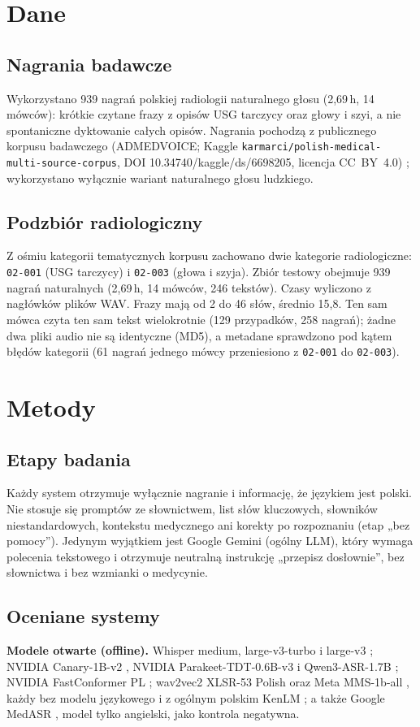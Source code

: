 \documentclass[conference]{IEEEtran}
\begin{document}
\section{Dane}
\subsection{Nagrania badawcze}
Wykorzystano 939 nagrań polskiej radiologii naturalnego głosu (2,69\,h, 14 mówców): krótkie czytane frazy z opisów USG tarczycy oraz głowy i szyi, a nie spontaniczne dyktowanie całych opisów. Nagrania pochodzą z publicznego korpusu badawczego (ADMEDVOICE; Kaggle \texttt{karmarci/polish-medical-multi-source-corpus}, DOI 10.34740/kaggle/ds/6698205, licencja CC~BY~4.0) \cite{r1}; wykorzystano wyłącznie wariant naturalnego głosu ludzkiego.

\subsection{Podzbiór radiologiczny}
Z ośmiu kategorii tematycznych korpusu zachowano dwie kategorie radiologiczne: \texttt{02-001} (USG tarczycy) i \texttt{02-003} (głowa i szyja). Zbiór testowy obejmuje 939 nagrań naturalnych (2,69\,h, 14 mówców, 246 tekstów). Czasy wyliczono z nagłówków plików WAV. Frazy mają od 2 do 46 słów, średnio 15,8. Ten sam mówca czyta ten sam tekst wielokrotnie (129 przypadków, 258 nagrań); żadne dwa pliki audio nie są identyczne (MD5), a metadane sprawdzono pod kątem błędów kategorii (61 nagrań jednego mówcy przeniesiono z \texttt{02-001} do \texttt{02-003}).

\section{Metody}
\subsection{Etapy badania}
Każdy system otrzymuje wyłącznie nagranie i informację, że językiem jest polski. Nie stosuje się promptów ze słownictwem, list słów kluczowych, słowników niestandardowych, kontekstu medycznego ani korekty po rozpoznaniu (etap „bez pomocy''). Jedynym wyjątkiem jest Google Gemini (ogólny LLM), który wymaga polecenia tekstowego i otrzymuje neutralną instrukcję „przepisz dosłownie'', bez słownictwa i bez wzmianki o medycynie.

\subsection{Oceniane systemy}\label{sec:evaluated}
\noindent\textbf{Modele otwarte (offline).} Whisper medium, large-v3-turbo i large-v3 \cite{r2}; NVIDIA Canary-1B-v2 \cite{r5}, NVIDIA Parakeet-TDT-0.6B-v3 \cite{r6} i Qwen3-ASR-1.7B \cite{r8}; NVIDIA FastConformer PL \cite{r7}; wav2vec2 XLSR-53 Polish \cite{r3,r9} oraz Meta MMS-1b-all \cite{r4}, każdy bez modelu językowego i z ogólnym polskim KenLM \cite{r20}; a także Google MedASR \cite{r10}, model tylko angielski, jako kontrola negatywna.
\end{document}
